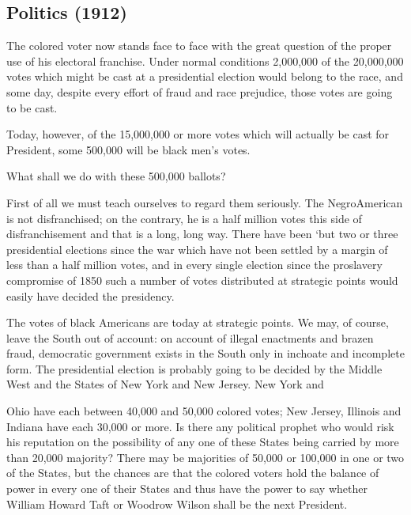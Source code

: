 \documentclass[letterpaper,10pt,english]{jupyterBook}
\begin{document}
\subsection{Politics (1912)}
\label{\detokenize{Volumes/04/04/politics:politics-1912}}\label{\detokenize{Volumes/04/04/politics::doc}}
\sphinxAtStartPar
The colored voter now stands face to face with the great question of the proper use of his electoral franchise. Under normal conditions 2,000,000 of the 20,000,000 votes which might be cast at a presidential election would belong to the race, and some day, despite every effort of fraud and race prejudice, those votes are going to be cast.

\sphinxAtStartPar
To\sphinxhyphen{}day, however, of the 15,000,000 or more votes which will actually be cast for President, some 500,000 will be black men’s votes.

\sphinxAtStartPar
What shall we do with these 500,000 ballots?

\sphinxAtStartPar
First of all we must teach ourselves to regard them seriously. The Negro\sphinxhyphen{}American is not disfranchised; on the contrary, he is a half million votes this side of disfranchisement and that is a long, long way. There have been ‘but two or three presidential elections since the war which have not been settled by a margin of less than a half million votes, and in every single election since the proslavery compromise of 1850 such a number of votes distributed at strategic points would easily have decided the presidency.

\sphinxAtStartPar
The votes of black Americans are today at strategic points. We may, of course, leave the South out of account: on account of illegal enactments and brazen fraud, democratic government exists in the South only in inchoate and incomplete form. The presidential election is probably going to be decided by the Middle West and the States of New York and New Jersey. New York and

\sphinxAtStartPar
Ohio have each between 40,000 and 50,000 colored votes; New Jersey, Illinois and Indiana have each 30,000 or more. Is there any political prophet who would risk his reputation on the possibility of any one of these States being carried by more than 20,000 majority? There may be majorities of 50,000 or 100,000 in one or two of the States, but the chances are that the colored voters hold the balance of power in every one of their States and thus have the power to say whether William Howard Taft or Woodrow Wilson shall be the next President.
\end{document}
